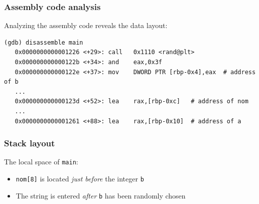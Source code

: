 \documentclass{beamer}
\begin{document}
\begin{frame}[fragile]
\frametitle{Assembly code analysis}

Analyzing the assembly code reveals the data layout:

\begin{lstlisting}[language={[x86masm]Assembler},basicstyle=\ttfamily\tiny]
(gdb) disassemble main
   0x0000000000001226 <+29>: call   0x1110 <rand@plt>
   0x000000000000122b <+34>: and    eax,0x3f
   0x000000000000122e <+37>: mov    DWORD PTR [rbp-0x4],eax  # address of b
   ...
   0x000000000000123d <+52>: lea    rax,[rbp-0xc]   # address of nom
   ...
   0x0000000000001261 <+88>: lea    rax,[rbp-0x10]  # address of a
\end{lstlisting}

\end{frame}


\begin{frame}[fragile]
\frametitle{Stack layout}

The local space of \texttt{main}:
\begin{center}
\end{center}

\begin{itemize}
\item \texttt{nom[8]} is located \emph{just before} the integer \texttt{b}
\item The string is entered \emph{after} \texttt{b} has been randomly chosen
\end{itemize}

\end{frame}
\end{document}
